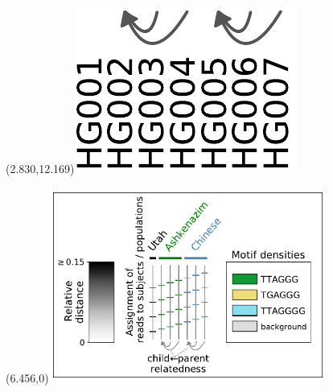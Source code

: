 \documentclass{article}
\begin{document}
\begin{textblock}{13}(2.830,12.169)\includegraphics[width=.93in,keepaspectratio]{Figure_4/fatter-arrows-labeled.pdf}\end{textblock}
\begin{textblock}{13}(6.456,0)\includegraphics[width=3.600in,keepaspectratio]{Figure_5/legend.pdf}\end{textblock}
\end{document}
